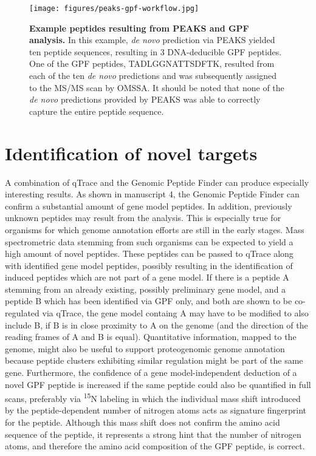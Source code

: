 \begin{figure}
\begin{center}
\texttt{[image: figures/peaks-gpf-workflow.jpg]}
\end{center}
\caption{
    {\bf Example peptides resulting from PEAKS and GPF analysis.}
    In this example, {\em de novo} prediction via PEAKS yielded
    ten peptide sequences, resulting in 3 DNA-deducible GPF peptides.
    One of the GPF peptides, TADLGGNATTSDFTK, resulted from each of
    the ten {\em de novo} predictions and was subsequently assigned
    to the MS/MS scan by OMSSA.
    It should be noted that none of the {\em de novo} predictions
    provided by PEAKS was able to correctly capture the entire peptide 
    sequence.
}
\label{fig:peaks-gpf-workflow}
\end{figure}


\section{Identification of novel targets}

A combination of qTrace and the Genomic Peptide Finder can produce especially
interesting results.
As shown in manuscript 4, the Genomic Peptide Finder can confirm a substantial
amount of gene model peptides.
In addition, previously unknown peptides may result from the analysis.
This is especially true for organisms for which genome annotation efforts
are still in the early stages.
Mass spectrometric data stemming from such organisms can be expected to
yield a high amount of novel peptides.
These peptides can be passed to qTrace along with identified gene model 
peptides, possibly resulting in the identification of induced peptides which
are not part of a gene model.
If there is a peptide A stemming from an already existing, possibly preliminary 
gene model, and a peptide B which has been identified via GPF only, and both
are shown to be co-regulated via qTrace, the gene model containg A may have to 
be modified to also include B, if B is in close proximity to A
on the genome (and the direction of the reading frames of A and B is equal).
Quantitative information, mapped to the genome, might also be useful to
support proteogenomic genome annotation because peptide clusters exhibiting 
similar regulation might be part of the same gene.
Furthermore, the confidence of a gene model-independent deduction of a novel 
GPF peptide is increased if the same peptide could also be quantified in full
scans, preferably via \textsuperscript{15}N labeling in which the individual
mass shift introduced by the peptide-dependent number of nitrogen atoms acts
as signature fingerprint for the peptide.
Although this mass shift does not confirm the amino acid sequence of the 
peptide, it represents a strong hint that the number of nitrogen atoms, and
therefore the amino acid composition of the GPF peptide, is correct.

